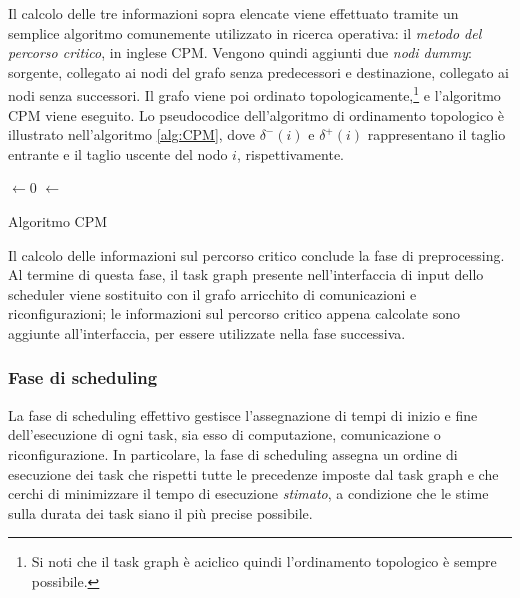 Il calcolo delle tre informazioni sopra elencate viene effettuato tramite un 
semplice algoritmo comunemente utilizzato in ricerca operativa: il \emph{metodo
del percorso critico}, in inglese \ac{CPM}.
Vengono quindi aggiunti due \emph{nodi dummy}: sorgente, collegato ai nodi del 
grafo senza predecessori e destinazione, collegato ai nodi senza successori.
Il grafo viene poi ordinato topologicamente,\footnote{Si noti che il task graph 
è aciclico quindi l'ordinamento topologico è sempre possibile.} e l'algoritmo 
\ac{CPM} viene eseguito. Lo pseudocodice dell'algoritmo di ordinamento 
topologico è illustrato nell'algoritmo \ref{alg:CPM}, dove $\delta^-(i)$ e 
$\delta^+(i)$ rappresentano il taglio entrante e il taglio uscente del nodo 
$i$, rispettivamente.

\IncMargin{1em}
\begin{algorithm}[!htbp]
 
 \BlankLine
  $\leftarrow 0$\;
  $\leftarrow$ \;
 \caption{Algoritmo CPM}
\label{alg:CPM}
\end{algorithm}
\DecMargin{1em}

Il calcolo delle informazioni sul percorso critico conclude la fase di 
preprocessing. Al termine di questa fase, il task graph presente 
nell'interfaccia di input dello scheduler viene sostituito con il grafo 
arricchito di comunicazioni e riconfigurazioni; le informazioni sul percorso 
critico appena calcolate sono aggiunte all'interfaccia, per essere utilizzate 
nella fase successiva.


\subsubsection{Fase di scheduling}
\label{subsec:faseScheduling}
La fase di scheduling effettivo gestisce l'assegnazione di tempi di inizio e 
fine dell'esecuzione di ogni task, sia esso di computazione, comunicazione o 
riconfigurazione. In particolare, la fase di scheduling assegna un ordine di 
esecuzione dei task che rispetti tutte le precedenze imposte dal task graph e 
che cerchi di minimizzare il tempo di esecuzione \emph{stimato}, a condizione
che le stime sulla durata dei task siano il più precise possibile.

